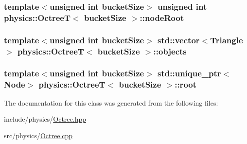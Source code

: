 \hypertarget{classphysics_1_1OctreeT_abe59395a4f9b0cdb0dfbd73ad5a2d52c}{
\subsubsection[{node\-Root}]{\setlength{\rightskip}{0pt plus 5cm}template$<$unsigned int bucket\-Size$>$ unsigned int {\bf physics\-::\-Octree\-T}$<$ bucket\-Size $>$\-::node\-Root}}\label{classphysics_1_1OctreeT_abe59395a4f9b0cdb0dfbd73ad5a2d52c}
\hypertarget{classphysics_1_1OctreeT_a4d8129f4786cc7cae4a6473b71419eba}{
\subsubsection[{objects}]{\setlength{\rightskip}{0pt plus 5cm}template$<$unsigned int bucket\-Size$>$ std\-::vector$<${\bf Triangle}$>$ {\bf physics\-::\-Octree\-T}$<$ bucket\-Size $>$\-::objects}}\label{classphysics_1_1OctreeT_a4d8129f4786cc7cae4a6473b71419eba}
\hypertarget{classphysics_1_1OctreeT_a268eb1b03538379bc0eecfe0d72a668c}{
\subsubsection[{root}]{\setlength{\rightskip}{0pt plus 5cm}template$<$unsigned int bucket\-Size$>$ std\-::unique\-\_\-ptr$<${\bf Node}$>$ {\bf physics\-::\-Octree\-T}$<$ bucket\-Size $>$\-::root}}\label{classphysics_1_1OctreeT_a268eb1b03538379bc0eecfe0d72a668c}


The documentation for this class was generated from the following files\-:\begin{DoxyCompactItemize}
\item 
include/physics/\hyperlink{Octree_8hpp}{Octree.\-hpp}\item 
src/physics/\hyperlink{Octree_8cpp}{Octree.\-cpp}\end{DoxyCompactItemize}
